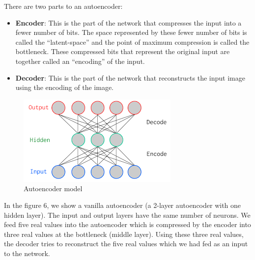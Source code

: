 \documentclass[%
 reprint,
 amsmath,amssymb,
 aps,
]{revtex4-1}
\begin{document}
There are two parts to an autoencoder:

\begin{itemize}
  \item  \textbf{Encoder}: This is the part of the network that compresses the input into a fewer number of bits. The space represented by these fewer number of bits is called the 	“latent-space” and the point of maximum compression is called the bottleneck. These compressed bits that represent the original input are together called an “encoding” of the input.
  \item  \textbf{Decoder}: This is the part of the network that reconstructs the input image using the encoding of the image.
\end{itemize}

\begin{figure}[!ht]
	\centering
	\includegraphics[width=0.8\columnwidth]{AutoEncoder}
	\caption{Autoencoder model}
	\centering
	\label{Autoencoder model}
\end{figure}

In the figure 6, we show a vanilla autoencoder (a 2-layer autoencoder with one hidden layer). The input and output layers have the same number of neurons. We feed five real values into the autoencoder which is compressed by the encoder into three real values at the bottleneck (middle layer). Using these three real values, the decoder tries to reconstruct the five real values which we had fed as an input to the network.
\end{document}
